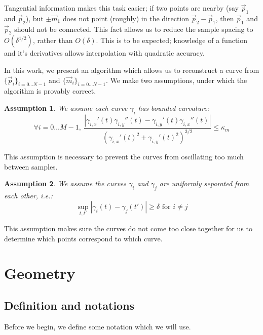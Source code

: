 \documentclass{article}
\newtheorem{assumption}{Assumption}
\numberwithin{cntr}{section}
\numberwithin{equation}{section}
\newcommand{\abs}[1]{\left| #1 \right|}%
\newcommand{\vp}[0]{{\vec{p}}}
\newcommand{\vm}[0]{{\vec{m}}}
\newcommand{\Oto}[1]{{0 \ldots #1-1}}
\newcommand{\OtoN}{{0 \ldots N-1}}
\newcommand{\pointData}{{ \{ \vp_{i} \}_{i=\OtoN} }}
\newcommand{\tanData}{{ \{ \vm_{i} \}_{i=\OtoN} }}
\newcommand{\kmax}{{\kappa_{m}}}
\newcommand{\curvesep}{{\delta}}
\begin{document}
Tangential information makes this task easier; if two points are nearby (say $\vp_{1}$ and $\vp_{2}$), but $\pm \vm_{1}$ does not point (roughly) in the direction $\vp_{2}-\vp_{1}$, then $\vp_{1}$ and $\vp_{2}$ should not be connected. This fact allows us to reduce the sample spacing to $O(\curvesep^{1/2})$, rather than $O(\curvesep)$. This is to be expected; knowledge of a function and it's derivatives allows interpolation with quadratic accuracy.

In this work, we present an algorithm which allows us to reconstruct a curve from $\pointData$ and $\tanData$. We make two assumptions, under which the algorithm is provably correct.

\begin{assumption}
  \label{ass:curvature}
  We assume each curve $\gamma_{i}$ has bounded curvature:
  \begin{equation}
    \label{eq:curvatureAssumption}
    \forall i = \Oto{M}, ~ \frac{
      \abs{\gamma_{i,x}'(t) \gamma_{i,y}''(t) - \gamma_{i,y}'(t) \gamma_{i,x}''(t)}
    } {
      (\gamma_{i,x}'(t)^{2}+\gamma_{i,y}'(t)^{2})^{3/2}
    } \leq \kmax
  \end{equation}
\end{assumption}

This assumption is necessary to prevent the curves from oscillating too much between samples.

\begin{assumption}
  \label{ass:separation}
  We assume the curves $\gamma_{i}$ and $\gamma_{j}$ are uniformly separated from each other, i.e.:
  \begin{equation}
    \label{eq:separationAssumption}
    \sup_{t,t'} \abs{ \gamma_{i}(t) - \gamma_{j}(t')} \geq \curvesep \textrm{~for~} i \neq j
  \end{equation}
\end{assumption}

This assumption makes sure the curves do not come too close together for us to determine which points correspond to which curve.

\section{Geometry}
\subsection{Definition and notations}
Before we begin, we define some notation which we will use.
\end{document}
